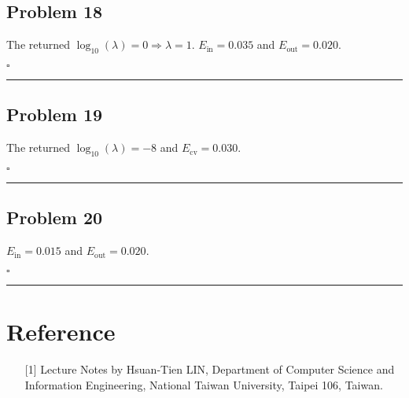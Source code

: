 \documentclass[12pt]{article}
\newcommand*{\QEDB}{\hfill\ensuremath{\square}}
\newcommand{\ParTh}[1]{\left(#1\right)}
\newcommand{\horrule}[1]{\rule{\linewidth}{#1}}
\begin{document}
\subsection*{Problem 18}

The returned $\log_{10}\ParTh{\lambda}=0\Rightarrow\lambda=1$. $E_{\text{in}}=0.035$ and $E_{\text{out}}=0.020$.

\QEDB

\horrule{0.5pt}

\subsection*{Problem 19}

The returned $\log_{10}\ParTh{\lambda}=-8$ and $E_{\text{cv}}=0.030$.

\QEDB

\horrule{0.5pt}

\subsection*{Problem 20}

$E_{\text{in}}=0.015$ and $E_{\text{out}}=0.020$.

\QEDB

\horrule{0.5pt}

\section*{Reference}

\begin{enumerate}

\item[{[1]}] Lecture Notes by Hsuan-Tien LIN, Department of Computer Science and Information Engineering, National Taiwan University, Taipei 106, Taiwan.


\end{enumerate}
\end{document}
